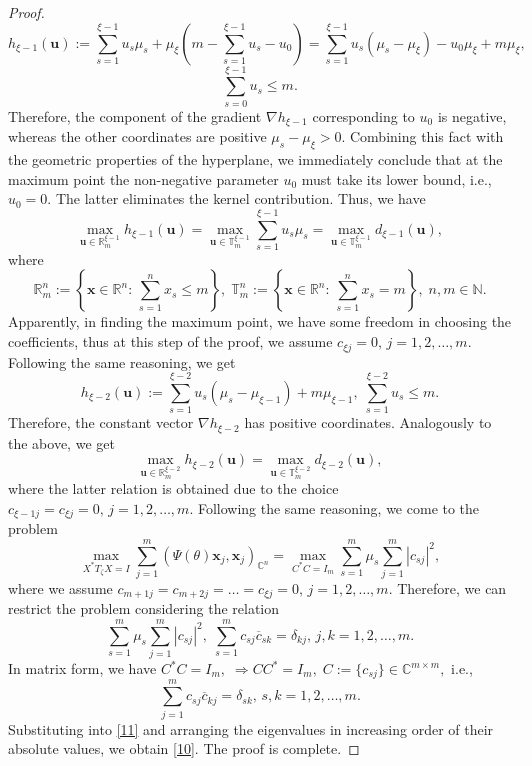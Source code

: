 \documentclass[10pt,a4paper]{amsart}
\begin{document}
\begin{proof}
$$
h_{\xi-1}(\mathbf{u}):=\sum\limits_{s=1}^{\xi-1}u_{s}\mu _{s}+\mu _{\xi}\left(m-\sum\limits_{s=1}^{\xi-1}u_{s}-u_{0}\right)=
\sum\limits_{s=1}^{\xi-1}u_{s} \left(\mu _{s}-\mu_{\xi}\right)-u_{0}\mu _{\xi}+m \mu _{\xi},
$$
$$
\sum\limits_{s=0}^{\xi-1}u_{s}\leq m.
$$
Therefore, the component of the gradient $\nabla h_{\xi-1}$ corresponding to   $u_{0}$ is   negative, whereas the  other  coordinates are positive  $ \mu_s - \mu_{\xi} > 0.$ Combining this fact with the geometric properties of the hyperplane, we immediately conclude that at the maximum point the non-negative parameter $u_{0}$ must take  its lower bound, i.e., $u_{0} = 0.$ The latter eliminates the kernel contribution. Thus, we  have
$$
\max \limits_{\mathbf{u}\in \mathbb{R}^{\xi-1}_{m}}  h_{\xi-1}(\mathbf{u})= \max\limits_{\mathbf{u}\in \mathbb{T}^{\xi-1}_{m}}\sum\limits_{s=1}^{\xi-1}u_{s}\mu_{s}=  \max\limits_{\mathbf{u}\in \mathbb{T}^{\xi-1}_{m}}  d_{\xi-1}(\mathbf{u}),
$$
where
$$
\mathbb{R}^{n}_{m}:=\left\{\mathbf{x}\in \mathbb{R}^{n}:\, \sum\limits_{s=1}^{n}x_{s}\leq m \right\},\;\mathbb{T}^{n}_{m}:=\left\{\mathbf{x}\in \mathbb{R}^{n}:\, \sum\limits_{s=1}^{n}x_{s}= m \right\},\;n,m\in \mathbb{N}.
$$
Apparently, in finding the maximum point, we have some freedom in choosing the coefficients, thus at this step of the proof, we   assume    $c_{\xi j}=0,\,j=1,2,\ldots,m.$
Following  the same reasoning, we get
\begin{equation*}
h_{\xi-2}(\mathbf{u}):=
\sum\limits_{s=1}^{\xi-2}u_{s} \left(\mu _{s}-\mu _{\xi-1}\right)+m \mu _{\xi-1},\;\sum\limits_{s=1}^{\xi-2}u_{s}\leq m.
\end{equation*}
Therefore, the constant vector $\nabla h_{\xi-2}$ has positive coordinates. Analogously to the above, we get
$$
\max\limits_{\mathbf{u}\in \mathbb{R}^{\xi-2}_{m}}  h_{\xi-2}(\mathbf{u})=   \max\limits_{\mathbf{u}\in \mathbb{T}^{\xi-2}_{m}}  d_{\xi-2}(\mathbf{u}),
$$
where the latter relation is obtained due to the choice  $c_{\xi-1j}=c_{\xi j}=0,\,j=1,2,\ldots,m.$
Following the same reasoning, we come to the problem
$$
\max\limits_{X^{\ast}T_{\zeta}X= I} \sum\limits_{j=1}^{m}(\Psi(\theta)\mathbf{x}_{j},\mathbf{x}_{j})_{\mathbb{C}^{n}}=\max\limits_{ C ^{\ast} C =I_{m}} \sum\limits_{s=1}^{m}\mu _{s} \sum\limits_{j=1}^{m}  |c_{sj }|^{2},
$$
where we assume  $c_{m+1j}=c_{m+2j}=\ldots=c_{\xi j}=0,\,j=1,2,\ldots,m.$
Therefore, we can restrict the problem considering the   relation
\begin{equation}\label{11}
      \sum\limits_{s=1}^{m}\mu_{s} \sum\limits_{j=1}^{m}  |c_{sj }|^{2}, \;
\sum\limits_{s=1}^{m} c _{sj }\overline{c }_{sk }  =\delta_{kj},\,j,k=1,2,\ldots,m.
\end{equation}
 In  matrix form, we have
$
 C ^{\ast} C =I_{m},\;  \Rightarrow  C C ^{\ast}=I_{m},\;C:=\{c_{sj}\}\in \mathbb{C}^{m\times m},
$
i.e.,
$$
\sum\limits_{j=1}^{m} c _{sj  }\overline{c }_{kj } =\delta_{sk},\,s,k=1,2,\ldots,m.
$$
Substituting   into \eqref{11} and    arranging   the eigenvalues in increasing order of their absolute values, we obtain \eqref{10}. The proof is complete.
\end{proof}
\end{document}
